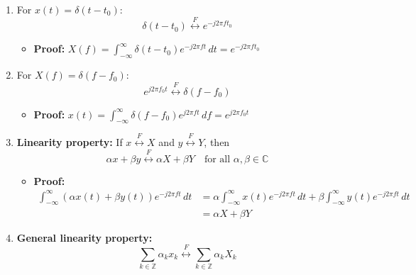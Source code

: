 \begin{definition}
\begin{enumerate}
    \item For \( x(t) = \delta(t - t_0) \):
    \begin{equation*}
        \delta(t - t_0) \overset{F}{\leftrightarrow} e^{-j 2 \pi f t_0} 
    \end{equation*}
    \begin{itemize}
        \item \textbf{Proof:} $X(f) = \int_{-\infty}^{\infty} \delta(t - t_0) e^{-j 2 \pi f t} \, dt = e^{-j 2 \pi f t_0}$
    \end{itemize}

    \item For \( X(f) = \delta(f - f_0) \):
    \begin{equation*}
        e^{j 2 \pi f_0 t} \overset{F}{\leftrightarrow} \delta(f - f_0)
    \end{equation*}
    \begin{itemize}
        \item \textbf{Proof:} $x(t) = \int_{-\infty}^{\infty} \delta(f - f_0) e^{j 2 \pi f t} \, df = e^{j 2 \pi f_0 t}$
    \end{itemize}

    \item \textbf{Linearity property:} If \( x \overset{F}{\leftrightarrow} X \) and \( y \overset{F}{\leftrightarrow} Y \), then
    \[
    \alpha x + \beta y \overset{F}{\leftrightarrow} \alpha X + \beta Y \quad \text{for all } \alpha, \beta \in \mathbb{C}
    \]
    \begin{itemize}
        \item \textbf{Proof:}
        \begin{align*}
            \int_{-\infty}^{\infty} \left( \alpha x(t) + \beta y(t) \right) e^{-j 2 \pi f t} \, dt &= \alpha \int_{-\infty}^{\infty} x(t) e^{-j 2 \pi f t} \, dt + \beta \int_{-\infty}^{\infty} y(t) e^{-j 2 \pi f t} \, dt \\
            &= \alpha X + \beta Y
        \end{align*}
    \end{itemize}
    \item \textbf{General linearity property:} 
    \[
    \sum_{k \in \mathbb{Z}} \alpha_k x_k \overset{F}{\leftrightarrow} \sum_{k \in \mathbb{Z}} \alpha_k X_k
    \]
    \end{enumerate}
\end{definition}

